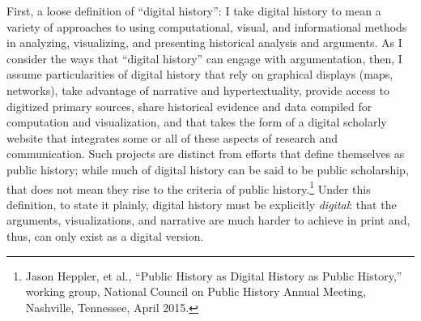 \documentclass[11pt,]{article}
\begin{document}
\noindent  First, a loose definition of ``digital history'': I take digital history
to mean a variety of approaches to using computational, visual, and
informational methods in analyzing, visualizing, and presenting
historical analysis and arguments. As I consider the ways that ``digital
history'' can engage with argumentation, then, I assume particularities
of digital history that rely on graphical displays (maps, networks),
take advantage of narrative and hypertextuality, provide access to
digitized primary sources, share historical evidence and data compiled
for computation and visualization, and that takes the form of a digital
scholarly website that integrates some or all of these aspects of
research and communication. Such projects are distinct from efforts that
define themselves as public history; while much of digital history can
be said to be public scholarship, that does not mean they rise to the
criteria of public history.\footnote{Jason Heppler, et al., ``Public
  History as Digital History as Public History,'' working group,
  National Council on Public History Annual Meeting, Nashville,
  Tennessee, April 2015.} Under this definition, to state it plainly,
digital history must be explicitly \emph{digital}: that the arguments,
visualizations, and narrative are much harder to achieve in print and,
thus, can only exist as a digital version.
\end{document}

